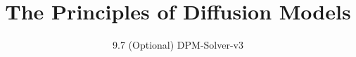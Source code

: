 
\title{The Principles of Diffusion Models}
\subtitle{9.7 (Optional) DPM-Solver-v3}


\begin{frame}
    \titlepage
\end{frame}



